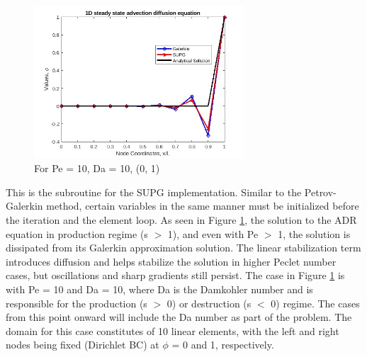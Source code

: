 \documentclass[12pt, oneside]{article}
\begin{document}
\begin{figure}[!h]
\centering
 \includegraphics[width=0.7\textwidth]{pe_10_da_10_supg_1_0.jpg}
 \caption{For Pe = 10, Da = 10, (0, 1)}
 \label{pe_10_da_10_1_0_supg}
\end{figure}
This is the subroutine for the SUPG implementation. Similar to the Petrov-Galerkin method, certain variables in the same manner must be initialized before the iteration and the element loop. As seen in Figure \ref{pe_10_da_10_1_0_supg}, the solution to the ADR equation in production regime (s $>$ 1), and even with Pe $>$ 1, the solution is dissipated from its Galerkin approximation solution. The linear stabilization term introduces diffusion and helps stabilize the solution in higher Peclet number cases, but oscillations and sharp gradients still persist. The case in Figure \ref{pe_10_da_10_1_0_supg} is with Pe = 10 and Da = 10, where Da is the Damkohler number and is responsible for the production (s $>$ 0) or destruction (s $<$ 0) regime. The cases from this point onward will include the Da number as part of the problem. The domain for this case constitutes of 10 linear elements, with the left and right nodes being fixed (Dirichlet BC) at $\phi$ = 0 and 1, respectively.
\end{document}
